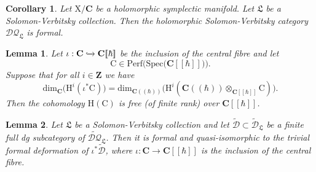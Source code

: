 \documentclass[10pt,a4paper]{amsart}
\newtheorem{corollary}{Corollary}
\newtheorem{lemma}{Lemma}
\newcommand{\C}{\mathbf C}
\newcommand{\brak}{[\![\hbar]\!]}
\newcommand{\cbrak}{(\!(\hbar)\!)}
\newcommand{\mr}{\mathrm}
\begin{document}
\begin{corollary}\label{lags}
Let $\mr{X}/\C$ be a holomorphic symplectic manifold. Let $\mathfrak{L}$ be a Solomon-Verbitsky collection. Then the holomorphic Solomon-Verbitsky category $\mathcal{DQ}_\mathfrak{L}$ is formal.
\end{corollary}

 \begin{lemma}\label{freelemma}
 Let $\iota : \C \xhookrightarrow{} \C\brak$ be the inclusion of the central fibre and let $$\mr{C} \in \mr{Perf}\big(\mr{Spec}\big(\C\brak\big)\big).$$ Suppose that for all $i\in \mathbf{Z}$ we have $$\mr{dim}_\C\big(\mr{H}^{i}(\iota^{*}\mr{C})\big) = \mr{dim}_{\C\cbrak}\big(\mr{H}^{i}(\C\cbrak\otimes_{\C\brak} \mr{C})\big).$$
 Then the cohomology $\mr{H}(\mr{C})$ is free (of finite rank) over $\C\brak$.
 \end{lemma}

\begin{lemma}
Let $\mathfrak{L}$ be a Solomon-Verbitsky collection and let $\widetilde{\mathcal{D}}\subset \widetilde{\mathcal{D}}_\mathfrak{L}$ be a finite full dg subcategory of $\widetilde{\mathcal{DQ}}_\mathfrak{L}$. Then it is formal and quasi-isomorphic to the trivial formal deformation of $\iota^*\widetilde{\mathcal{D}}$, where $\iota :\C\to \C\brak$ is the inclusion of the central fibre.
\end{lemma}
\end{document}
